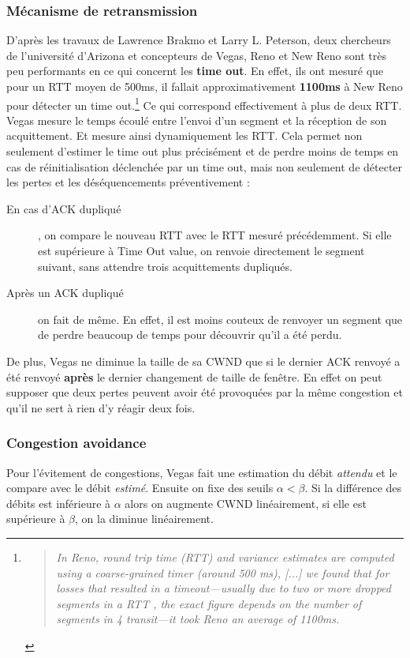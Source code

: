 \documentclass[	DIV=calc,%
							paper=a4,%
							fontsize=11pt,%
							twocolumn]{scrartcl}	 					%
\begin{document}
\subsubsection*{Mécanisme de retransmission}
D'après les travaux de Lawrence Brakmo et Larry L. Peterson, deux chercheurs de l'université d'Arizona et concepteurs de Vegas, Reno et New Reno sont très peu performants en ce qui concernt les \textbf{time out}. En effet, ils ont mesuré que pour un RTT moyen de 500ms, il fallait approximativement \textbf{1100ms} à New Reno pour détecter un time out.\footnote{\begin{quote}\textit{In Reno, round trip time (RTT) and variance estimates are computed using a coarse-grained timer (around 500 ms), [...] we found that for losses that resulted in a timeout—usually due to two or more dropped segments in a RTT , the exact figure depends on the number of segments in 4 transit—it took Reno an average of 1100ms.}\end{quote}} Ce qui correspond effectivement à plus de deux RTT. Vegas mesure le temps écoulé entre l'envoi d'un segment et la réception de son acquittement. Et mesure ainsi dynamiquement les RTT.
Cela permet non seulement d'estimer le time out plus précisément et de perdre moins de temps en cas de réinitialisation déclenchée par un time out, mais non seulement de détecter les pertes et les déséquencements préventivement :
\begin{description}
	\item[En cas d'ACK dupliqué]{, on compare le nouveau RTT avec le RTT mesuré précédemment. Si elle est supérieure à Time Out value, on renvoie directement le segment suivant, sans attendre trois acquittements dupliqués.}
	\item[Après un ACK dupliqué]{on fait de même. En effet, il est moins couteux de renvoyer un segment que de perdre beaucoup de temps pour découvrir qu'il a été perdu. }
\end{description}
De plus, Vegas ne diminue la taille de sa CWND que si le dernier ACK renvoyé a été renvoyé \textbf{après} le dernier changement de taille de fenêtre. En effet on peut supposer que deux pertes peuvent avoir été provoquées par la même congestion et qu'il ne sert à rien d'y réagir deux fois.
\subsubsection*{Congestion avoidance}
Pour l'évitement de congestions, Vegas fait une estimation du débit \textit{attendu} et le compare avec le débit \textit{estimé}. Ensuite on fixe des seuils $\alpha<\beta$. Si la différence des débits est inférieure à $\alpha$ alors on augmente CWND linéairement, si elle est supérieure à $ \beta $, on la diminue linéairement.
\end{document}
